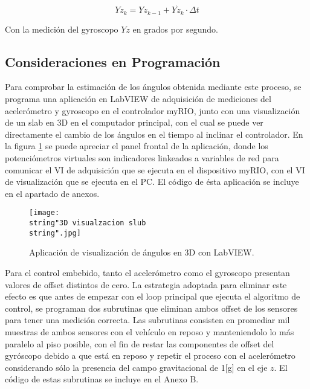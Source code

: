 \documentclass[../main.tex]{subfiles}
\begin{document}
\begin{equation}
Yz_{k}=Yz_{k-1} + \dot{Yz_{k}}\cdot\Delta t
\end{equation}

Con la medición del gyroscopo $Yz$ en grados
por segundo.

\subsection{Consideraciones en Programación}

Para comprobar la estimación de los ángulos obtenida mediante este
proceso, se programa una aplicación en LabVIEW de adquisición de mediciones
del acelerómetro y gyroscopo en el controlador myRIO, junto con una
visualización de un slab en 3D en el computador principal, con el
cual se puede ver directamente el cambio de los ángulos en el tiempo
al inclinar el controlador. En la figura \ref{fig: Slab 3D} se puede apreciar el panel frontal de la aplicación, donde los potenciómetros virtuales son indicadores linkeados a variables de red para comunicar el VI de adquisición que se ejecuta en el dispositivo myRIO, con el VI de visualización que se ejecuta en el PC.
El código de ésta aplicación se incluye
en el apartado de anexos.

\begin{figure}[H]
\noindent \begin{centering}
\texttt{[image: \\string"3D visualzacion slub\\string".jpg]}
\par\end{centering}
\caption{Aplicación de visualización de ángulos en 3D con LabVIEW.}\label{fig: Slab 3D}\noindent 
\end{figure}

Para el control embebido, tanto el acelerómetro como el gyroscopo
presentan valores de offset distintos de cero. La estrategia adoptada
para eliminar este efecto es que antes de empezar con el loop principal
que ejecuta el algoritmo de control, se programan dos subrutinas que
eliminan ambos offset de los sensores para tener una medición correcta.
Las subrutinas consisten en promediar mil muestras de ambos sensores
con el vehículo en reposo y manteniendolo lo más paralelo al piso
posible, con el fin de restar las componentes de offset del gyróscopo
debido a que está en reposo y repetir el proceso con el acelerómetro
considerando sólo la presencia del campo gravitacional de 1{[}g{]}
en el eje $z$. El código de estas subrutinas se incluye en el Anexo B.
\end{document}
